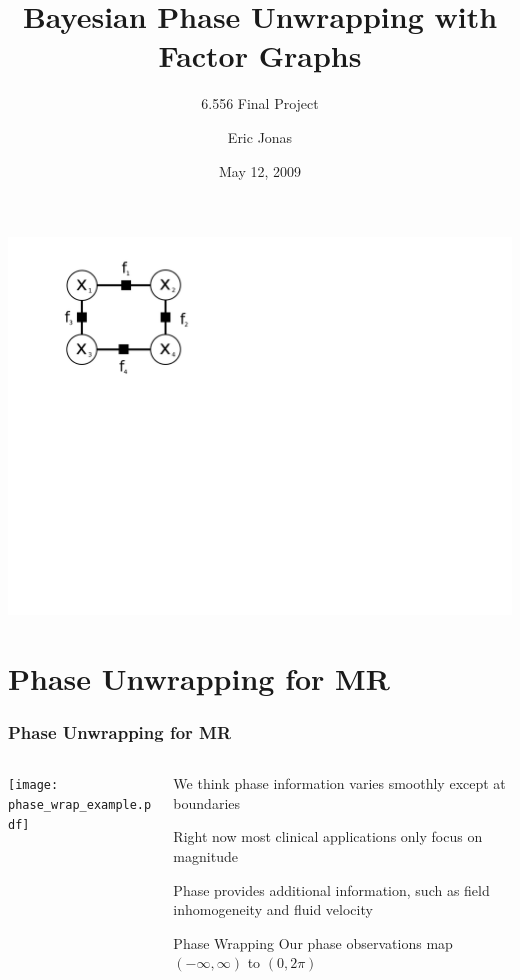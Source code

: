 \documentclass[compress]{beamer}
\title{Bayesian Phase Unwrapping with Factor Graphs}
\subtitle[6.556]{6.556 Final Project}
\author{Eric Jonas}
\date{May 12, 2009}
\institute[MIT BCS]{MIT Brain \& Cognitive Sciences}
\begin{document}
\begin{frame}
\maketitle
\includegraphics{4node_fg}
\end{frame}

\begin{frame}
\tableofcontents
\end{frame}

\section{Phase Unwrapping for MR}
\frame{\tableofcontents[currentsection]}

\begin{frame}
  \frametitle{Phase Unwrapping for MR} 
    \begin{columns}
    \begin{column}{6cm}
      \texttt{[image: phase\_wrap\_example.pdf]}

    \end{column}
    \begin{column}{5cm}
      We think phase information varies smoothly except at boundaries

      Right now most clinical applications only focus on magnitude

      Phase provides additional information, such as field inhomogeneity
      and fluid velocity
      \pause
      \begin{alertblock}{Phase Wrapping}
        Our phase observations map $(-\infty, \infty)$ to $(0, 2\pi)$
      \end{alertblock}
    \end{column}
  \end{columns}

\end{frame}
\end{document}
